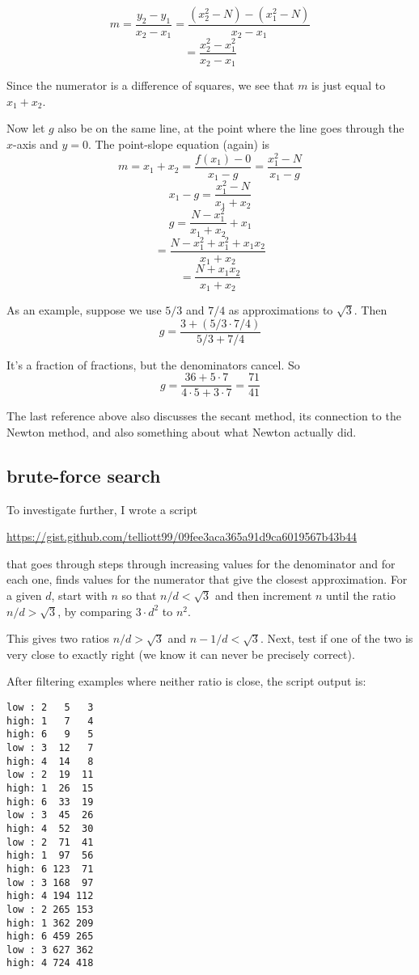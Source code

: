 \documentclass[11pt, oneside]{article}
\begin{document}
\[ m = \frac{y_2 - y_1}{x_2 - x_1} = \frac{(x_2^2 - N) - (x_1^2 - N)}{x_2 - x_1} \]
\[ = \frac{x_2^2 - x_1^2}{x_2 - x_1} \]

Since the numerator is a difference of squares, we see that $m$ is just equal to $x_1 + x_2$.

Now let $g$ also be on the same line, at the point where the line goes through the $x$-axis and $y = 0$.  The point-slope equation (again) is
\[ m = x_1 + x_2 = \frac{f(x_1) - 0}{x_1 - g} = \frac{x_1^2 - N}{x_1 - g} \]
\[ x_1 - g = \frac{x_1^2 - N}{x_1 + x_2} \]
\[ g = \frac{N - x_1^2}{x_1 + x_2} + x_1 \]
\[ = \frac{N - x_1^2 + x_1^2 + x_1x_2}{x_1 + x_2} \]
\[ = \frac{N + x_1x_2}{x_1 + x_2} \]

As an example, suppose we use $5/3$ and $7/4$ as approximations to $\sqrt{3}$.  Then
\[ g = \frac{3 + (5/3 \cdot 7/4)} {5/3 + 7/4} \]

It's a fraction of fractions, but the denominators cancel.  So
\[ g = \frac{36 + 5 \cdot 7}{4 \cdot 5 + 3 \cdot 7} = \frac{71}{41} \]

The last reference above also discusses the secant method, its connection to the Newton method, and also something about what Newton actually did.

\subsection*{brute-force search}

To investigate further, I wrote a script

\url{https://gist.github.com/telliott99/09fee3aca365a91d9ca6019567b43b44}

that goes through steps through increasing values for the denominator and for each one, finds values for the numerator that give the closest approximation.  For a given $d$, start with $n$ so that $n/d < \sqrt{3}$ and then increment $n$ until the ratio $n/d > \sqrt{3}$, by comparing $3 \cdot d^2$ to $n^2$.

This gives two ratios $n/d > \sqrt{3}$ and $n-1/d < \sqrt{3}$.  Next, test if one of the two is very close to exactly right (we know it can never be precisely correct).

After filtering examples where neither ratio is close, the script output is:

\begin{verbatim}
low : 2   5   3
high: 1   7   4
high: 6   9   5
low : 3  12   7
high: 4  14   8
low : 2  19  11
high: 1  26  15
high: 6  33  19
low : 3  45  26
high: 4  52  30
low : 2  71  41
high: 1  97  56
high: 6 123  71
low : 3 168  97
high: 4 194 112
low : 2 265 153
high: 1 362 209
high: 6 459 265
low : 3 627 362
high: 4 724 418
\end{verbatim}
\end{document}
